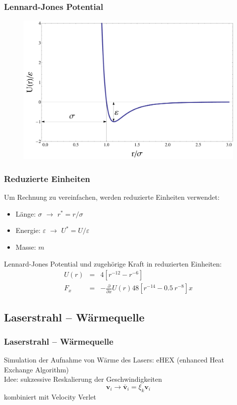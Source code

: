 \documentclass{beamer}
\begin{document}
\begin{frame}
\frametitle{Lennard-Jones Potential}
\begin{center}
\begin{figure}
\includegraphics[scale=0.3]{../images/LJ-2.pdf}
\end{figure}
\end{center}
\end{frame}

\begin{frame}
\frametitle{Reduzierte Einheiten}
Um Rechnung zu vereinfachen, werden reduzierte Einheiten verwendet:
\begin{itemize}
\item Länge: $\sigma$ $\rightarrow$ $r^* = r/\sigma$
\item Energie: $\varepsilon$ $\rightarrow$ $U^* = U/\varepsilon$
\item Masse: $m$
\end{itemize}
Lennard-Jones Potential und zugehörige Kraft in reduzierten Einheiten:
\begin{eqnarray}
    U(r) &=& 4\left[{r}^{-12} - {r}^{-6}\right] \\
    F_{x} &=& -\frac{\partial}{\partial x} U(r) 48 \left[r^{-14} - 0.5 \ r^{-8}\right] x
\end{eqnarray}
\end{frame}



\subsection{Laserstrahl -- Wärmequelle}
\begin{frame}
\frametitle{Laserstrahl -- Wärmequelle}
Simulation der Aufnahme von Wärme des Lasers: eHEX (enhanced Heat Exchange Algorithm)\\
Idee: sukzessive Reskalierung der Geschwindigkeiten 
\begin{equation}
    \mathbf{v}_i \rightarrow \mathbf{\bar{v}}_i = \xi_k \mathbf{v}_i
\end{equation}
kombiniert mit Velocity Verlet

\end{frame}
\end{document}
